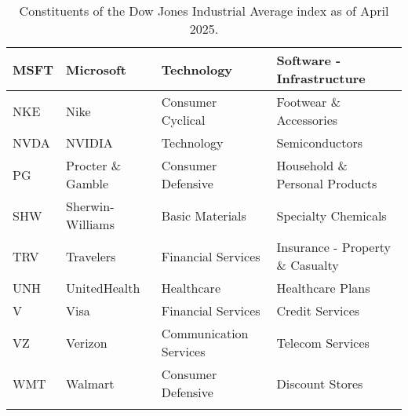 \begin{longtable}{|p{2cm}|p{3cm}|p{4cm}|p{4cm}|}
MSFT & Microsoft & Technology & Software - Infrastructure \\ \hline
NKE & Nike & Consumer Cyclical & Footwear \& Accessories \\ \hline
NVDA & NVIDIA & Technology & Semiconductors \\ \hline
PG & Procter \& Gamble & Consumer Defensive & Household \& Personal Products \\ \hline
SHW & Sherwin-Williams & Basic Materials & Specialty Chemicals \\ \hline
TRV & Travelers & Financial Services & Insurance - Property \& Casualty \\ \hline
UNH & UnitedHealth & Healthcare & Healthcare Plans \\ \hline
V & Visa & Financial Services & Credit Services \\ \hline
VZ & Verizon & Communication Services & Telecom Services \\ \hline
WMT & Walmart & Consumer Defensive & Discount Stores \\ \hline
\caption{Constituents of the Dow Jones Industrial Average index as of April 2025. \cite{WikipediaDowJones30}}
\label{tab:dow30constituents}
\end{longtable}
